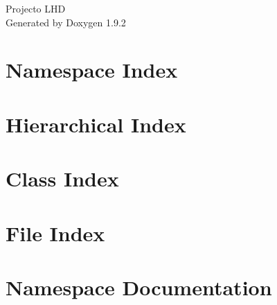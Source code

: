 \documentclass[twoside]{book}
\newcommand{\+}{\discretionary{\mbox{\scriptsize$\hookleftarrow$}}{}{}}
\newcommand{\clearemptydoublepage}{%
    \newpage{\pagestyle{empty}\cleardoublepage}%
  }
\begin{document}
  \raggedbottom
    \hypersetup{pageanchor=false,
                bookmarksnumbered=true,
                pdfencoding=unicode
               }
  \begin{titlepage}
  \vspace*{7cm}
  \begin{center}%
  {\Large Projecto LHD}\\
  \vspace*{1cm}
  {\large Generated by Doxygen 1.9.2}\\
  \end{center}
  \end{titlepage}
  \clearemptydoublepage
  \tableofcontents
  \clearemptydoublepage
  \hypersetup{pageanchor=true}
\chapter{Namespace Index}

\chapter{Hierarchical Index}

\chapter{Class Index}

\chapter{File Index}

\chapter{Namespace Documentation}




\end{document}
